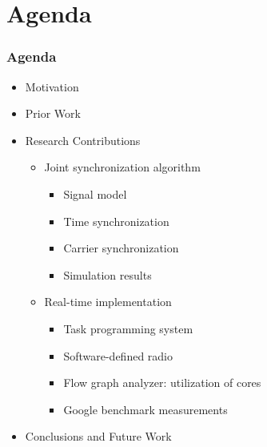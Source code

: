 \section{Agenda}

\begin{frame}
  \frametitle{Agenda}
    \begin{itemize}
        \item{Motivation}
        \item{Prior Work}
        \item{Research Contributions} 
        \begin{itemize}
            \item Joint synchronization algorithm
                \begin{itemize}
                \item Signal model
                \item Time synchronization
                \item Carrier synchronization
                \item Simulation results
                \end{itemize}
            \item Real-time implementation
                \begin{itemize}
                \item Task programming system
                \item Software-defined radio
                \item Flow graph analyzer: utilization of cores
                \item Google benchmark measurements
                \end{itemize}
        \end{itemize}
        \item{Conclusions and Future Work}
    \end{itemize}
\end{frame}